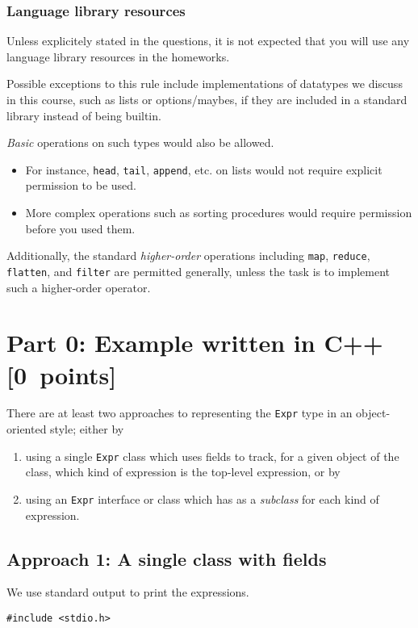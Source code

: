 \documentclass[11pt]{article}
\begin{document}
\subsubsection*{Language library resources}
\label{sec:org1d7ac60}

Unless explicitely stated in the questions,
it is not expected that you will use any language library resources
in the homeworks.

Possible exceptions to this rule include implementations
of datatypes we discuss in this course, such as lists
or options/maybes, if they are included in a standard library
instead of being builtin.

\emph{Basic} operations on such types would also be allowed.
\begin{itemize}
\item For instance, \texttt{head}, \texttt{tail}, \texttt{append}, etc. on lists
would not require explicit permission to be used.
\item More complex operations such as sorting procedures
would require permission before you used them.
\end{itemize}

Additionally, the standard \emph{higher-order} operations
including \texttt{map}, \texttt{reduce}, \texttt{flatten}, and \texttt{filter} are permitted generally,
unless the task is to implement such a higher-order operator.

\section*{Part 0: Example written in C++                   [0 points]}
\label{sec:org6c792b1}
There are at least two approaches to representing the \texttt{Expr} type
in an object-oriented style;
either by
\begin{enumerate}
\item using a single \texttt{Expr} class which uses fields to track,
for a given object of the class,
which kind of expression is the top-level expression, or by
\item using an \texttt{Expr} interface or class which has as a \emph{subclass} for
each kind of expression.
\end{enumerate}

\subsection*{Approach 1: A single class with fields}
\label{sec:orgbf2d644}
We use standard output to print the expressions.
\begin{verbatim}
#include <stdio.h>
\end{verbatim}
\end{document}
